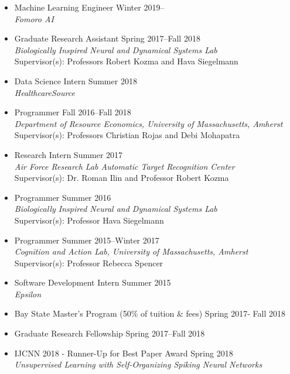 \documentclass[11pt]{article}
\renewcommand{\section}[1]
{\vspace{1.0\baselineskip}{\Large\textbf{#1}}}
\begin{document}
\begin{itemize}[leftmargin=12pt]
  \item[] Machine Learning Engineer \hfill Winter 2019-- \\
  \textit{Fomoro AI}
  \item[] Graduate Research Assistant \hfill Spring 2017--Fall 2018 \\
  \textit{Biologically Inspired Neural and Dynamical Systems Lab} \\
  Supervisor(s): Professors Robert Kozma and Hava Siegelmann
  \item[] Data Science Intern \hfill Summer 2018 \\
  \textit{HealthcareSource}
  \item[] Programmer \hfill Fall 2016--Fall 2018 \\
  \textit{Department of Resource Economics, University of Massachusetts, Amherst} \\
  Supervisor(s): Professors Christian Rojas and Debi Mohapatra
  \item[] Research Intern \hfill Summer 2017 \\
  \textit{Air Force Research Lab Automatic Target Recognition Center} \\
  Supervisor(s): Dr. Roman Ilin and Professor Robert Kozma
  \item[] Programmer \hfill Summer 2016 \\
  \textit{Biologically Inspired Neural and Dynamical Systems Lab} \\
  Supervisor(s): Professor Hava Siegelmann
  \item[] Programmer \hfill Summer 2015--Winter 2017 \\
  \textit{Cognition and Action Lab, University of Massachusetts, Amherst} \\
  Supervisor(s): Professor Rebecca Spencer
  \item[] Software Development Intern \hfill Summer 2015 \\
  \textit{Epsilon}
\end{itemize}

\section{Awards}

\begin{itemize}[leftmargin=12pt]
  \item[] Bay State Master's Program (50\% of tuition \& fees) \hfill Spring 2017- Fall 2018
  \item[] Graduate Research Fellowship \hfill Spring 2017--Fall 2018
  \item[] IJCNN 2018 - Runner-Up for Best Paper Award \hfill Spring 2018 \\ \textit{Unsupervised Learning with Self-Organizing Spiking Neural Networks}
\end{itemize}
\end{document}

